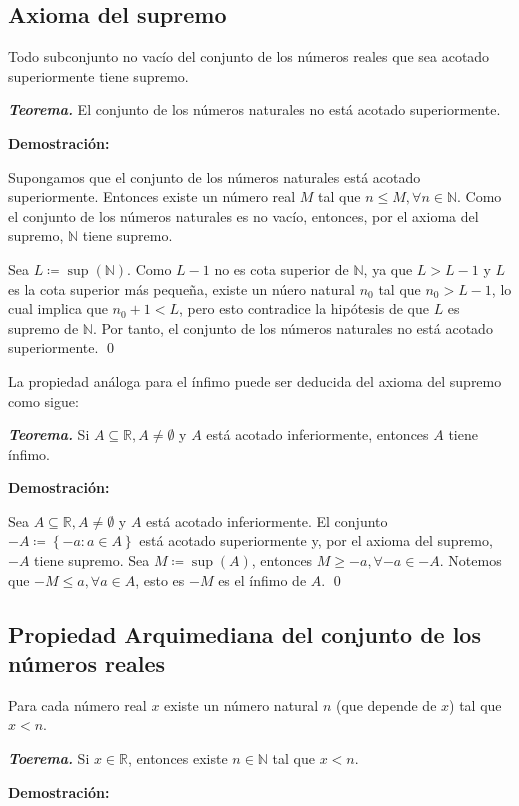 \documentclass[11pt]{article}
\newcommand{\N}{\mathbb{N}}
\newcommand{\R}{\mathbb{R}}
\def\defined #1{\coloneqq \left\{#1\right\}}
\begin{document}
\subsection*{Axioma del supremo}

Todo subconjunto no vacío del conjunto de los números reales que sea acotado superiormente tiene supremo.

\textbf{\textit{Teorema.}} El conjunto de los números naturales no está acotado superiormente.

\textbf{Demostración:}

Supongamos que el conjunto de los números naturales está acotado superiormente. Entonces existe un número real $M$ tal que $n\leq M, \forall n\in \N$. Como el conjunto de los números naturales es no vacío, entonces, por el axioma del supremo, $\N$ tiene supremo.

Sea $L\coloneqq \sup{(\N)}$. Como $L-1$ no es cota superior de $\N$, ya que $L>L-1$ y $L$ es la cota superior más pequeña, existe un núero natural $n_0$ tal que $n_0>L-1$, lo cual implica que $n_0+1<L$, pero esto contradice la hipótesis	de que $L$ es supremo de $\N$. Por tanto, el conjunto de los números naturales no está acotado superiormente. \qed

La propiedad análoga para el ínfimo puede ser deducida del axioma del supremo como sigue:

\textbf{\textit{Teorema.}} Si $A\subseteq \R, A\neq \emptyset$ y $A$ está acotado inferiormente, entonces $A$ tiene ínfimo.

\textbf{Demostración:}

Sea $A\subseteq \R, A\neq \emptyset$ y $A$ está acotado inferiormente. El conjunto $-A \defined{-a: a\in A}$ está acotado superiormente y, por el axioma del supremo, $-A$ tiene supremo. Sea $M\coloneqq \sup{(A)}$, entonces $M\geq -a, \forall -a\in -A$. Notemos que $-M\leq a, \forall a\in A$, esto es $-M$ es el ínfimo de $A$. \qed

\subsection*{Propiedad Arquimediana del conjunto de los números reales}

Para cada número real $x$ existe un número natural $n$ (que depende de $x$) tal que $x<n$.

\textbf{\textit{Toerema.}} Si $x\in \R$, entonces existe $n\in \N$ tal que $x<n$.

\textbf{Demostración:}
\end{document}
